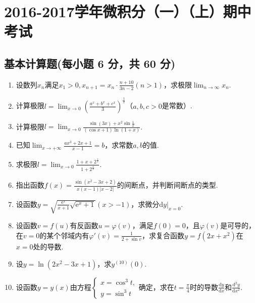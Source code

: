\documentclass[../Main.tex]{subfiles}
\begin{document}
\chapter{2016-2017学年微积分（一）（上）期中考试}

\section{基本计算题(每小题 6 分，共 60 分)}
\begin{enumerate}
    \item 设数列$x_{n}$满足$x_{1}>0,x_{n+1}=x_{n}\cdot\frac{n+10}{3n-2}(n>1)$，求极限$\lim
              _{n\to\infty}x_{n}$.
          \vspace{11em}

    \item 计算极限$l=\lim_{x\to 0}\left(\frac{a^{x}+b^{x}+c^{x}}{3}\right)^{\frac{1}{x}}$（$a
              ,b,c>0$是常数）.
          \vspace{10em}

    \item 计算极限$l=\lim_{x\to 0}\frac{\sin(3x)+x^{2}\sin\frac{1}{x}}{(\cos x+1)\ln(1+x)}$.
          \vspace{11em}

    \item 已知$\lim_{x\to+\infty}\frac{ax^{3}+2x+1}{x-1}=b$，求常数$a,b$的值.
          \vspace{10em}

    \item 求极限$l=\lim_{x\to0}\frac{1+x+2^{\frac{1}{x}}}{1+2^{\frac{1}{x}}}$.
          \vspace{10em}

    \item 指出函数$f(x)=\frac{\sin(x^{2}-3x+2)}{x(x-1)|x-2|}$的间断点，并判断间断点的类型.
          \vspace{10em}

    \item 设函数$y=\sqrt{\frac{\mathrm{e}^{x}}{x+1}\sqrt{\mathrm{e}^{x}+1}}(x>-1)$，求微分$\left
              .\mathrm{d}y\right |_{x=0}$.
          \vspace{9em}

    \item 设函数$v=f(u)$有反函数$u=\varphi(v)$，满足$f(0)=0$，且$\varphi(v)$是可导的，在$v
              =0$的某个邻域内有$\varphi'(v)=\frac{1}{2+\sin v}$，求复合函数$y=f(2x+x^{2})$在$x
              =0$处的导数.
          \vspace{9em}

    \item 设$y=\ln(2x^{2}-3x+1)$，求$y^{(10)}(0)$.
          \vspace{8em}

    \item 设函数$y=y(x)$由方程$\begin{cases}
                  x=\cos^{3} t, \\
                  y=\sin^{3} t
              \end{cases}$确定，求在$t=\frac{\pi}{4}$时的导数$\frac{\mathrm{d}y}{\mathrm{d}x}$和$\frac{\mathrm{d}^{2}y}{\mathrm{d}x^{2}}$.
          \vspace{8em}
\end{enumerate}
\end{document}
